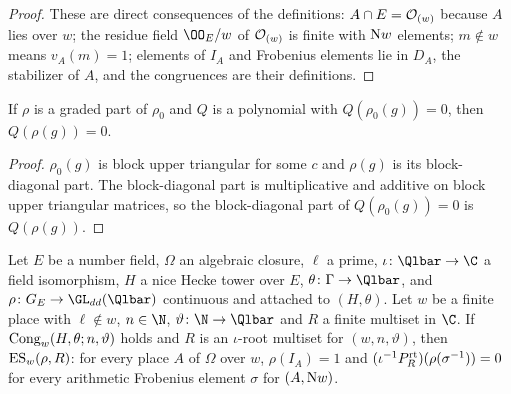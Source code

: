 \begin{proof}
These are direct consequences of the definitions: $A\cap E=\mathcal{O}_{(w)}$ because $A$ lies over $w$; the
residue field $\OO_E/w$ of $\mathcal{O}_{(w)}$ is finite with $\mathrm{N}w$ elements; $m\notin w$ means
$v_A(m)=1$; elements of $I_A$ and Frobenius elements lie in $D_A$, the stabilizer of $A$, and the
congruences are their definitions.
\end{proof}

\begin{lemma}\label{lem:pf:steps2:grpass}
If $\rho$ is a graded part of $\rho_0$ and $Q$ is a polynomial with $Q(\rho_0(g))=0$, then
$Q(\rho(g))=0$.
\end{lemma}

\begin{proof}
$\rho_0(g)$ is block upper triangular for some $c$ and $\rho(g)$ is its block-diagonal part. The
block-diagonal part is multiplicative and additive on block upper triangular matrices, so the
block-diagonal part of $Q(\rho_0(g))=0$ is $Q(\rho(g))$.
\end{proof}

\begin{theorem}\label{thm:pf:steps2:esstep}
Let $E$ be a number field, $\Omega$ an algebraic closure, $\ell$ a prime, $\iota\colon\Qlbar\to\C$ a
field isomorphism, $H$ a nice Hecke tower over $E$, $\theta\colon\Gamma\to\Qlbar$, and
$\rho\colon G_E\to\GL_{dd}(\Qlbar)$ continuous and attached to $(H,\theta)$. Let $w$ be a finite place
with $\ell\notin w$, $n\in\N$, $\vartheta\colon\N\to\Qlbar$ and $R$ a finite multiset in $\C$. If
$\mathrm{Cong}_w(H,\theta;n,\vartheta)$ holds and $R$ is an $\iota$-root multiset for $(w,n,\vartheta)$,
then $\mathrm{ES}_w(\rho,R)$: for every place $A$ of $\Omega$ over $w$, $\rho(I_A)=1$ and
$(\iota^{-1}P^{\mathrm{rt}}_R)(\rho(\sigma^{-1}))=0$ for every arithmetic Frobenius element $\sigma$ for
$(A,\mathrm{N}w)$.
\end{theorem}

